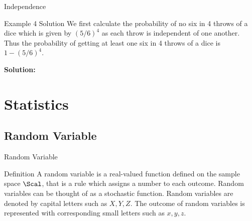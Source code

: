 \documentclass[aspectratio=169,xcolor=dvipsnames,svgnames,x11names,fleqn]{beamer}
\newcommand{\showanswers}{yes}
\begin{document}
    \begin{frame}[containsverbatim]{Independence}
        \ifthenelse{\equal{\showanswers}{yes}}
        {
    \begin{examplesolution}{Example 4 Solution}
        We first calculate the probability of no six in 4 throws of a dice which is given by $(5/6)^4$ as each throw is independent of one another. Thus the probability of getting at least one six in 4 throws of a dice is $1 - (5/6)^4$.
        \end{examplesolution}
        }
        {
            \textbf{Solution:} \color{LightGray}{Blank space for calculation}
        }
    \end{frame}

\section{Statistics}

\begin{frame}
    \sectionpage
\end{frame}



\subsection{Random Variable}

\begin{frame}
    \subsectionpage
\end{frame}


\begin{frame}[containsverbatim]{Random Variable}
    \begin{tblock}{Definition}
        A random variable is a real-valued function defined on the sample space $\Scal$, that is a rule which assigns a number to each outcome. Random variables can be thought of as a stochastic function. Random variables are denoted by capital letters such as $X, Y, Z$. The outcome of random variables is represented with corresponding small letters such as $x, y, z$.
    
    \end{tblock}

\end{frame}
\end{document}
